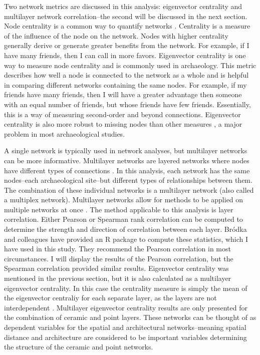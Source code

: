 \documentclass[]{interact}
\theoremstyle{plain}%
\theoremstyle{definition}
\theoremstyle{remark}
\begin{document}
Two network metrics are discussed in this analysis: eigenvector
centrality and multilayer network correlation--the second will be
discussed in the next section. Node centrality is a common way to
quantify networks \citep{Borgatti2005-iz}. Centrality is a measure of
the influence of the node on the network. Nodes with higher centrality
generally derive or generate greater benefits from the network. For
example, if I have many friends, then I can call in more favors.
Eigenvector centrality is one way to measure node centrality and is
commonly used in archaeology. This metric describes how well a node is
connected to the network as a whole and is helpful in comparing
different networks containing the same nodes. For example, if my friends
have many friends, then I will have a greater advantage then someone
with an equal number of friends, but whose friends have few friends.
Essentially, this is a way of measuring second-order and beyond
connections. Eigenvector centrality is also more robust to missing nodes
than other measures \citep{Peeples2017-kl}, a major problem in most
archaeological studies.

A single network is typically used in network analyses, but multilayer
networks can be more informative. Multilayer networks are layered
networks where nodes have different types of connections
\citep{Kivela2014-mh}. In this analysis, each network has the same
nodes--each archaeological site--but different types of relationships
between them. The combination of these individual networks is a
multilayer network (also called a multiplex network). Multilayer
networks allow for methods to be applied on multiple networks at once
\citep[see][]{Brodka2018-vz}. The method applicable to this analysis is
layer correlation. Either Pearson or Spearman rank correlation can be
computed to determine the strength and direction of correlation between
each layer. Bródka and colleagues \citeyearpar{Brodka2018-vz} have
provided an R package to compute these statistics, which I have used in
this study. They recommend the Pearson correlation in most
circumstances. I will display the results of the Pearson correlation,
but the Spearman correlation provided similar results. Eigenvector
centrality was mentioned in the previous section, but it is also
calculated as a multilayer eigenvector centrality. In this case the
centrality measure is simply the mean of the eigenvector centraliy for
each separate layer, as the layers are not interdependent
\citep{Frost2022-lr}. Multilayer eigenvector centrality results are only
presented for the combination of ceramic and point layers. These
networks can be thought of as dependent variables for the spatial and
architectural networks--meaning spatial distance and architecture are
considered to be important variables determining the structure of the
ceramic and point networks.
\end{document}
